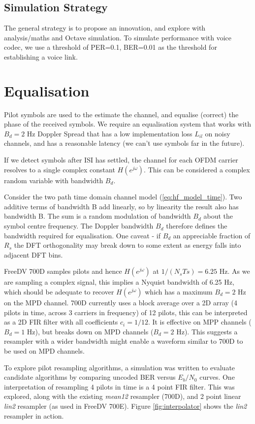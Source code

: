 \documentclass{article}
\begin{document}
\subsection{Simulation Strategy}

The general strategy is to propose an innovation, and explore with analysis/maths and Octave simulation. To simulate performance with voice codec, we use a threshold of PER=0.1, BER=0.01 as the threshold for establishing a voice link.

\section{Equalisation}

Pilot symbols are used to the estimate the channel, and equalise (correct) the phase of the received symbols.  We require an equalisation system that works with $B_d=2$ Hz Doppler Spread that has a low implementation loss $L_{il}$ on noisy channels, and has a reasonable latency (we can't use symbols far in the future).

If we detect symbols after ISI has settled, the channel for each OFDM carrier resolves to a single complex constant $H(e^{j \omega})$. This can be considered a complex random variable with bandwidth $B_d$. 

Consider the two path time domain channel model (\ref{eq:hf_model_time}). Two additive terms of bandwidth B add linearly, so by linearity the result also has bandwidth B.  The sum is a random modulation of bandwidth $B_d$ about the symbol centre frequency.  The Doppler bandwidth $B_d$ therefore defines the bandwidth required for equalisation. One caveat - if $B_d$ an appreciable fraction of $R_s$ the DFT orthogonality may break down to some extent as energy falls into adjacent DFT bins.

FreeDV 700D samples pilots and hence $H(e^{j \omega})$ at $1/(N_sTs)=6.25$ Hz.  As we are sampling a complex signal, this implies a Nyquist bandwidth of 6.25 Hz, which should be adequate to recover $H(e^{j \omega})$ which has a maximum $B_d=2$ Hz on the MPD channel. 700D currently uses a block average over a 2D array (4 pilots in time, across 3 carriers in frequency) of 12 pilots, this can be interpreted as a 2D FIR filter with all coefficients $c_i=1/12$. It is effective on MPP channels ($B_d=1$ Hz), but breaks down on MPD channels ($B_d=2$ Hz).  This suggests a resampler with a wider bandwidth might enable a waveform similar to 700D to be used on MPD channels.

To explore pilot resampling algorithms, a simulation was written to evaluate candidate algorithms by comparing uncoded BER versus $E_b/N_0$ curves.  One interpretation of resampling 4 pilots in time is a 4 point FIR filter. This was explored, along with the existing \emph{mean12} resampler (700D), and 2 point linear \emph{lin2} resampler (as used in FreeDV 700E). Figure \ref{fig:interpolator} shows the \emph{lin2} resampler in action.
\end{document}
